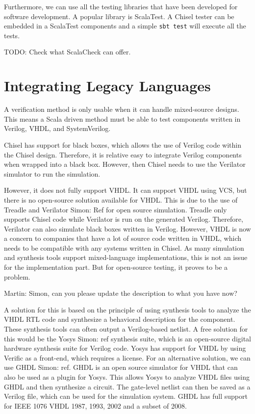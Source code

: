 \documentclass[conference]{IEEEtran}
\newcommand{\code}[1]{{\small{\texttt{#1}}}}
\newcommand{\todo}[1]{{\color{olive} TODO: #1}}
\newcommand{\martin}[1]{{\color{blue} Martin: #1}}
\newcommand{\simon}[1]{{\color{green} Simon: #1}}
\begin{document}
Furthermore, we can use all the testing libraries that have been developed for
software development. A popular library is ScalaTest. A Chisel tester can be embedded
in a ScalaTest components and a simple \code{sbt test} will execute all the tests.

\todo{Check what ScalaCheck can offer.}

\section{Integrating Legacy Languages}

A verification method is only usable when it can handle mixed-source designs.
This means a Scala driven method must be able to test components written in Verilog,
VHDL, and SystemVerilog.

Chisel has support for black boxes, which allows the use of Verilog code within the Chisel design.
Therefore, it is relative easy to integrate Verilog components when wrapped into a black box.
However, then Chisel needs to use the Verilator simulator to run the simulation.


However, it does not fully support VHDL. It can support VHDL using VCS, but there is no
open-source solution available for VHDL.
This is due to the use of Treadle and Verilator \simon{Ref} for open source simulation.
Treadle only supports Chisel code while Verilator is run on the generated Verilog.
Therefore, Verilator can also simulate black boxes written in Verilog.
However, VHDL is now a concern to companies that have a lot of source code written in VHDL,
which needs to be compatible with any systems written in Chisel.
As many simulation and synthesis tools support mixed-language implementations,
this is not an issue for the implementation part. But for open-source testing, it proves to be a problem.

\martin{Simon, can you please update the description to what you have now?}

A solution for this is based on the principle of using synthesis tools to analyze the VHDL RTL code
and synthesize a behavioral description for the component.
These synthesis tools can often output a Verilog-based netlist.
A free solution for this would be the Yosys \simon{ref} synthesis suite, which is an open-source
digital hardware synthesis suite for Verilog code.
Yosys has support for VHDL by using Verific as a front-end, which requires a license.
For an alternative solution, we can use GHDL \simon{ref}.
GHDL is an open source simulator for VHDL that can also be used as a plugin for Yosys.
This allows Yosys to analyze VHDL files using GHDL and then synthesize a circuit.
The gate-level netlist can then be saved as a Verilog file, which can be used for the simulation system.
GHDL has full support for IEEE 1076 VHDL 1987, 1993, 2002 and a subset of 2008.
\end{document}
